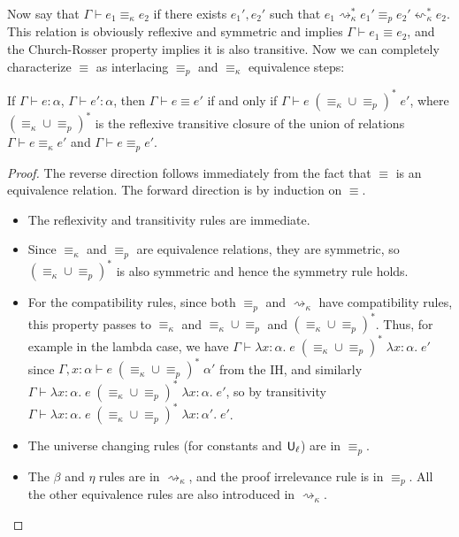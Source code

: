 Now say that $\Gamma\vdash e_1\equiv_\kappa e_2$ if there exists $e_1',e_2'$ such that $e_1\rightsquigarrow_\kappa^* e_1'\equiv_p e_2'\leftsquigarrow_\kappa^* e_2$. This relation is obviously reflexive and symmetric and implies $\Gamma\vdash e_1\equiv e_2$, and the Church-Rosser property implies it is also transitive. Now we can completely characterize $\equiv$ as interlacing $\equiv_p$ and $\equiv_\kappa$ equivalence steps:

\begin{theorem}\label{ckappa}
If $\Gamma \vdash e:\alpha$, $\Gamma \vdash e':\alpha$, then
$\Gamma\vdash e\equiv e'$ if and only if $\Gamma\vdash e\;(\equiv_\kappa\cup\equiv_p)^*\;e'$, where $(\equiv_\kappa\cup\equiv_p)^*$ is the reflexive transitive closure of the union of relations $\Gamma\vdash e\equiv_\kappa e'$ and $\Gamma\vdash e \equiv_p e'$.
\end{theorem}
\begin{proof}
The reverse direction follows immediately from the fact that $\equiv$ is an equivalence relation. The forward direction is by induction on $\equiv$.
\begin{itemize}
\item The reflexivity and transitivity rules are immediate.
\item Since $\equiv_\kappa$ and $\equiv_p$ are equivalence relations, they are symmetric, so $(\equiv_\kappa\cup\equiv_p)^*$ is also symmetric and hence the symmetry rule holds.
\item For the compatibility rules, since both $\equiv_p$ and $\rightsquigarrow_\kappa$ have compatibility rules, this property passes to $\equiv_\kappa$ and $\equiv_\kappa\cup\equiv_p$ and $(\equiv_\kappa\cup\equiv_p)^*$. Thus, for example in the lambda case, we have $\Gamma\vdash\lambda x:\alpha.\;e\;(\equiv_\kappa\cup\equiv_p)^*\;\lambda x:\alpha.\;e'$ since $\Gamma,x:\alpha\vdash e\;(\equiv_\kappa\cup\equiv_p)^*\;\alpha'$ from the IH, and similarly $\Gamma\vdash\lambda x:\alpha.\;e\;(\equiv_\kappa\cup\equiv_p)^*\;\lambda x:\alpha.\;e'$, so by transitivity $\Gamma\vdash\lambda x:\alpha.\;e\;(\equiv_\kappa\cup\equiv_p)^*\;\lambda x:\alpha'.\;e'$.
\item The universe changing rules (for constants and $\mathsf{U}_\ell$) are in $\equiv_p$.
\item The $\beta$ and $\eta$ rules are in $\rightsquigarrow_\kappa$, and the proof irrelevance rule is in $\equiv_p$. All the other equivalence rules are also introduced in $\rightsquigarrow_\kappa$.
\end{itemize}
\end{proof}


